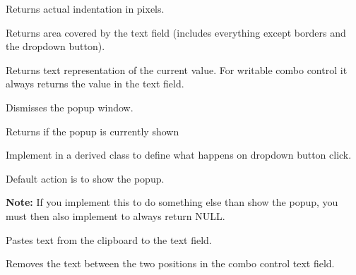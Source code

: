 Returns actual indentation in pixels.


\label{wxcomboctrlgettextrect}


Returns area covered by the text field (includes everything except
borders and the dropdown button).


\label{wxcomboctrlgetvalue}


Returns text representation of the current value. For writable
combo control it always returns the value in the text field.


\label{wxcomboctrlhidepopup}


Dismisses the popup window.


\label{wxcomboctrlispopupshown}


Returns \true if the popup is currently shown


\label{wxcomboctrlonbuttonclick}


Implement in a derived class to define what happens on
dropdown button click.

Default action is to show the popup.

\textbf{Note:} If you implement this to do something else than
show the popup, you must then also implement
 to always
return NULL.


\label{wxcomboctrlpaste}


Pastes text from the clipboard to the text field.


\label{wxcomboctrlremove}


Removes the text between the two positions in the combo control text field.



